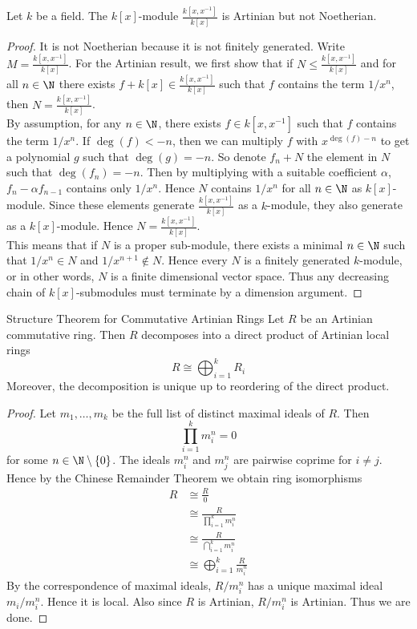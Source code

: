 \documentclass[a4paper]{article}
\begin{document}
\begin{eg}{}{} Let $k$ be a field. The $k[x]$-module $\frac{k[x,x^{-1}]}{k[x]}$ is Artinian but not Noetherian. 
\begin{proof}
It is not Noetherian because it is not finitely generated. Write $M=\frac{k[x,x^{-1}]}{k[x]}$. For the Artinian result, we first show that if $N\leq\frac{k[x,x^{-1}]}{k[x]}$ and for all $n\in\N$ there exists $f+k[x]\in\frac{k[x,x^{-1}]}{k[x]}$ such that $f$ contains the term $1/x^n$, then $N=\frac{k[x,x^{-1}]}{k[x]}$. \\

By assumption, for any $n\in\N$, there exists $f\in k[x,x^{-1}]$ such that $f$ contains the term $1/x^n$. If $\deg(f)<-n$, then we can multiply $f$ with $x^{\deg(f)-n}$ to get a polynomial $g$ such that $\deg(g)=-n$. So denote $f_n+N$ the element in $N$ such that $\deg(f_n)=-n$. Then by multiplying with a suitable coefficient $\alpha$, $f_n-\alpha f_{n-1}$ contains only $1/x^n$. Hence $N$ contains $1/x^n$ for all $n\in\N$ as $k[x]$-module. Since these elements generate $\frac{k[x,x^{-1}]}{k[x]}$ as a $k$-module, they also generate as a $k[x]$-module. Hence $N=\frac{k[x,x^{-1}]}{k[x]}$. \\

This means that if $N$ is a proper sub-module, there exists a minimal $n\in\N$ such that $1/x^n\in N$ and $1/x^{n+1}\notin N$. Hence every $N$ is a finitely generated $k$-module, or in other words, $N$ is a finite dimensional vector space. Thus any decreasing chain of $k[x]$-submodules must terminate by a dimension argument. 
\end{proof}
\end{eg}

\begin{thm}{Structure Theorem for Commutative Artinian Rings}{} Let $R$ be an Artinian commutative ring. Then $R$ decomposes into a direct product of Artinian local rings $$R\cong\bigoplus_{i=1}^k R_i$$ Moreover, the decomposition is unique up to reordering of the direct product.  
\begin{proof}
Let $m_1,\dots,m_k$ be the full list of distinct maximal ideals of $R$. Then $$\prod_{i=1}^km_i^n=0$$ for some $n\in\N\setminus\{0\}$. The ideals $m_i^n$ and $m_j^n$ are pairwise coprime for $i\neq j$. Hence by the Chinese Remainder Theorem we obtain ring isomorphisms 
\begin{align*}
R&\cong\frac{R}{0}\\
&\cong\frac{R}{\prod_{i=1}^km_i^n}\\
&\cong\frac{R}{\bigcap_{i=1}^km_i^n}\tag{$m_i^n$ and $m_j^n$ pairwise coprime}\\
&\cong\bigoplus_{i=1}^k\frac{R}{m_i^n}\tag{CRT}
\end{align*}
By the correspondence of maximal ideals, $R/m_i^n$ has a unique maximal ideal $m_i/m_i^n$. Hence it is local. Also since $R$ is Artinian, $R/m_i^n$ is Artinian. Thus we are done. 
\end{proof}
\end{thm}
\end{document}
